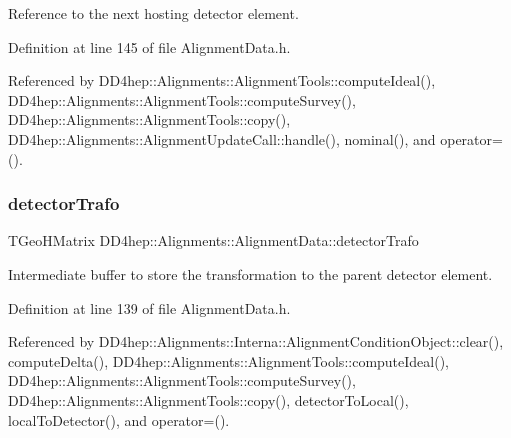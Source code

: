 Reference to the next hosting detector element. 



Definition at line 145 of file Alignment\+Data.\+h.



Referenced by D\+D4hep\+::\+Alignments\+::\+Alignment\+Tools\+::compute\+Ideal(), D\+D4hep\+::\+Alignments\+::\+Alignment\+Tools\+::compute\+Survey(), D\+D4hep\+::\+Alignments\+::\+Alignment\+Tools\+::copy(), D\+D4hep\+::\+Alignments\+::\+Alignment\+Update\+Call\+::handle(), nominal(), and operator=().

\hypertarget{class_d_d4hep_1_1_alignments_1_1_alignment_data_a7c01e8657259af3afa97d01c4d7d1733}{}\label{class_d_d4hep_1_1_alignments_1_1_alignment_data_a7c01e8657259af3afa97d01c4d7d1733} 
\subsubsection{\texorpdfstring{detector\+Trafo}{detectorTrafo}}
{\footnotesize\ttfamily T\+Geo\+H\+Matrix D\+D4hep\+::\+Alignments\+::\+Alignment\+Data\+::detector\+Trafo\hspace{0.3cm}{\ttfamily [mutable]}}



Intermediate buffer to store the transformation to the parent detector element. 



Definition at line 139 of file Alignment\+Data.\+h.



Referenced by D\+D4hep\+::\+Alignments\+::\+Interna\+::\+Alignment\+Condition\+Object\+::clear(), compute\+Delta(), D\+D4hep\+::\+Alignments\+::\+Alignment\+Tools\+::compute\+Ideal(), D\+D4hep\+::\+Alignments\+::\+Alignment\+Tools\+::compute\+Survey(), D\+D4hep\+::\+Alignments\+::\+Alignment\+Tools\+::copy(), detector\+To\+Local(), local\+To\+Detector(), and operator=().

\hypertarget{class_d_d4hep_1_1_alignments_1_1_alignment_data_a49383dd1e10e850bfeb455440439dec2}{}\label{class_d_d4hep_1_1_alignments_1_1_alignment_data_a49383dd1e10e850bfeb455440439dec2} 
